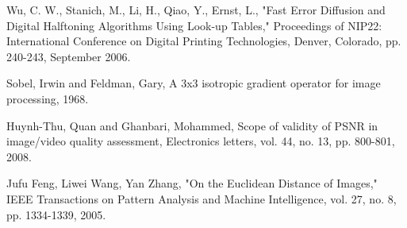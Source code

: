 \documentclass[12pt]{amsart}
\theoremstyle{definition}
\theoremstyle{remark}
\numberwithin{thm}{section}
\begin{document}
\begin{thebibliography}{widest entry}
Wu, C. W., Stanich, M., Li, H., Qiao, Y., Ernst, L., "Fast Error Diffusion and Digital Halftoning Algorithms Using Look-up Tables," Proceedings of NIP22: International Conference on Digital Printing Technologies, Denver, Colorado, pp. 240-243, September 2006.


Sobel, Irwin and Feldman, Gary,
{A 3x3 isotropic gradient operator for image processing}, 1968.

Huynh-Thu, Quan and Ghanbari, Mohammed,
Scope of validity of PSNR in image/video quality assessment,
Electronics letters, vol. 44, no. 13, pp. 800-801, 2008.

Jufu Feng, Liwei Wang, Yan Zhang, "On the Euclidean Distance of Images," IEEE Transactions on Pattern Analysis and Machine Intelligence, vol. 27, no. 8, pp. 1334-1339, 2005.
\end{thebibliography}
 
\end{document}
